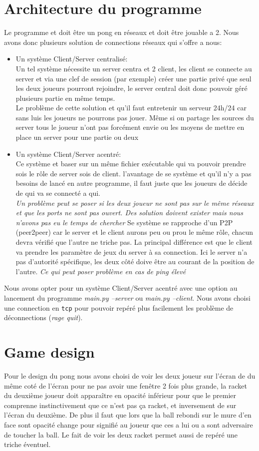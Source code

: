 \documentclass[12pt]{report}
\begin{document}
\chapter{Architecture du programme}
Le programme et doit être un pong en réseaux et doit être jouable a 2.
Nous avons donc plusieurs solution de connections réseaux qui s'offre a
nous:
\begin{itemize}
\item Un système Client/Server centralisé: \\
  Un tel système nécessite un server centra et 2 client, les client se
  connecte au server et via une clef de session (par exemple) créer une partie
  privé que seul les deux joueurs pourront rejoindre, le server central doit
  donc pouvoir géré plusieurs partie en même temps. \\
  Le problème de cette solution et qu'il faut entretenir un serveur 24h/24
  car sans luis les joueurs ne pourrons pas jouer.
  Même si on partage les sources du server tous le joueur n'ont pas forcément
  envie ou les moyens de mettre en place un server pour une partie ou deux
\item Un système Client/Server acentré: \\
  Ce système et baser sur un même fichier exécutable qui va pouvoir prendre
  sois le rôle de server sois de client. l'avantage de se système et qu'il n'y
  a pas besoins de lancé en autre programme, il faut juste que les joueurs de
  décide de qui va se connecté a qui. \\
  \textit{Un problème peut se poser si les deux joueur ne sont pas sur le même
    réseaux et que les ports ne sont pas ouvert. Des solution doivent exister
    mais nous n'avons pas eu le temps de chercher}
  Se système se rapproche d'un P2P (peer2peer) car le server et le client
  aurons peu ou prou le même rôle, chacun devra vérifié que l'autre ne triche
  pas. La principal différence est que le client va prendre les paramètre de
  jeux du server à sa connection.
  Ici le server n'a pas d'autorité spécifique, les deux côté doive être au
  courant de la position de l'autre.
  \textit{Ce qui peut poser problème en cas de ping élevé}
\end{itemize}
Nous avons opter pour un système Client/Server acentré avec une option au
lancement du programme \textit{main.py --server} ou \textit{main.py --client}.
Nous avons choisi une connection en \texttt{tcp} pour pouvoir repéré plus
facilement les problème de déconnections (\textit{rage quit}).

\chapter{Game design}
Pour le design du pong nous avons choisi de voir les deux joueur sur l'écran
de du même coté de l'écran pour ne pas avoir une fenêtre 2 fois plus grande,
la racket du deuxième joueur doit apparaître en opacité inférieur pour que
le premier comprenne instinctivement que ce n'est pas ça racket, et inversement
de sur l'écran du deuxième.
De plus il faut que lors que la ball rebondi sur le mure d'en face sont opacité
change pour signifié au joueur que ces a lui ou a sont adversaire de toucher la
ball.
Le fait de voir les deux racket permet aussi de repéré une triche éventuel.
\end{document}
